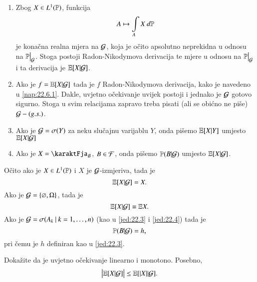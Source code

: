\begin{nap} \label{nap:22.6}
    \begin{enumerate}[label=(\alph*)]
        \item   \label{nap:22.6.1}
        Zbog $X \in L^1 (\mathbb{P})$, funkcija
        \begin{equation*}
            A \mapsto \int\limits_A X \: d \mathbb{P}
        \end{equation*}
        je kona\v cna realna mjera na $\mathcal{G}$, koja je o\v cito apsolutno neprekidna u odnosu na $\restr{\masP}{\famG}$.
        Stoga postoji Radon-Nikodymova derivacija te mjere u odnosu na $\restr{\masP}{\famG}$ i ta derivacija je $\mathbb{E} [X | \mathcal{G}]$.
        \item   \label{nap:22.6.2}
        Ako je $f = \mathbb{E} [X | \mathcal{G}]$ tada je $f$ Radon-Nikodymova derivacija, kako je navedeno u \eqref{nap:22.6.1}.
        Dakle, uvjetno o\v cekivanje uvijek postoji i jednako je $\mathcal{G}$ gotovo sigurno.
        Stoga u svim relacijama zapravo treba pisati (ali se obi\' cno ne pi\v se) $\mathcal{G}-(g.s.)$.
        \item   \label{nap:22.6.3}
        Ako je $\mathcal{G} = \sigma({Y})$ za neku slu\v cajnu varijablu $Y$, onda pi\v semo $\mathbb{E} [X | Y]$ umjesto $\mathbb{E} [X | \mathcal{G}]$
        \item   \label{nap:22.6.4}
        Ako je $X = \karaktFja_B$, $B \in \mathcal{F}$, onda pi\v semo $ \mathbb{P} (B | \mathcal{G}) $ umjesto $\mathbb{E} [X | \mathcal{G}]$. 
    \end{enumerate}
\end{nap}

O\v cito ako je $X \in L^1 (\mathbb{P})$ i $X$ je $\mathcal{G}$-izmjeriva, tada je
\begin{equation}    \label{jed:22.7}
    \mathbb{E} [X | \mathcal{G}] = X.
\end{equation}
Ako je $\mathcal{G} = \{ \varnothing, \Omega \}$, tada je
\begin{equation}    \label{jed:22.8}
    \mathbb{E} [X | \mathcal{G}] \equiv \mathbb{E} X.
\end{equation}
Ako je $\mathcal{G} = \sigma({A_k} \: | \: {k = 1, \ldots, n})$ (kao u \eqref{jed:22.3} i \eqref{jed:22.4}) tada je
\begin{equation}    \label{jed:22.9}
    \mathbb{P} (B | \mathcal{G}) = h,
\end{equation}
pri \v cemu je $h$ definiran kao u \eqref{jed:22.3}.

\begin{zad} \label{zad:22.10}
    Doka\v zite da je uvjetno o\v cekivanje linearno i monotono.
    Posebno,
    \begin{equation*}
        \big| \mathbb{E} [X | \mathcal{G}] \big| \leq \mathbb{E} [|X| | \mathcal{G}].
    \end{equation*}
\end{zad}

